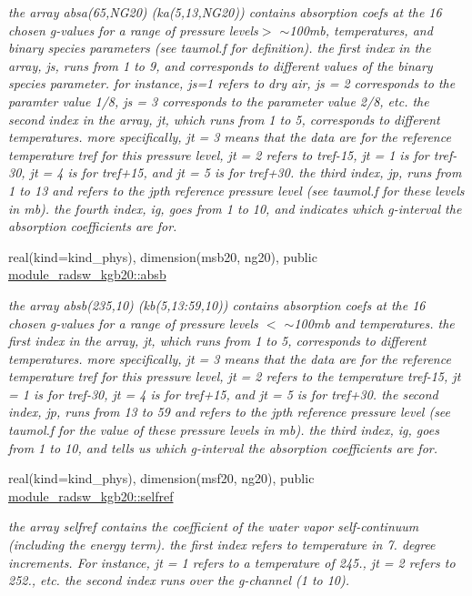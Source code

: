 \begin{Indent}
\begin{DoxyCompactItemize}
\begin{DoxyCompactList}\small\item\em the array absa(65,\+N\+G20) (ka(5,13,\+N\+G20)) contains absorption coefs at the 16 chosen g-\/values for a range of pressure levels$>$ $\sim$100mb, temperatures, and binary species parameters (see taumol.\+f for definition). the first index in the array, js, runs from 1 to 9, and corresponds to different values of the binary species parameter. for instance, js=1 refers to dry air, js = 2 corresponds to the paramter value 1/8, js = 3 corresponds to the parameter value 2/8, etc. the second index in the array, jt, which runs from 1 to 5, corresponds to different temperatures. more specifically, jt = 3 means that the data are for the reference temperature tref for this pressure level, jt = 2 refers to tref-\/15, jt = 1 is for tref-\/30, jt = 4 is for tref+15, and jt = 5 is for tref+30. the third index, jp, runs from 1 to 13 and refers to the jpth reference pressure level (see taumol.\+f for these levels in mb). the fourth index, ig, goes from 1 to 10, and indicates which g-\/interval the absorption coefficients are for. \end{DoxyCompactList}\item 
real(kind=kind\+\_\+phys), dimension(msb20, ng20), public \hyperlink{group__module__radsw__kgbnn_gaf5b135f82f34831e86a12f726cbe47ad}{module\+\_\+radsw\+\_\+kgb20\+::absb}
\begin{DoxyCompactList}\small\item\em the array absb(235,10) (kb(5,13\+:59,10)) contains absorption coefs at the 16 chosen g-\/values for a range of pressure levels $<$ $\sim$100mb and temperatures. the first index in the array, jt, which runs from 1 to 5, corresponds to different temperatures. more specifically, jt = 3 means that the data are for the reference temperature tref for this pressure level, jt = 2 refers to the temperature tref-\/15, jt = 1 is for tref-\/30, jt = 4 is for tref+15, and jt = 5 is for tref+30. the second index, jp, runs from 13 to 59 and refers to the jpth reference pressure level (see taumol.\+f for the value of these pressure levels in mb). the third index, ig, goes from 1 to 10, and tells us which g-\/interval the absorption coefficients are for. \end{DoxyCompactList}\item 
real(kind=kind\+\_\+phys), dimension(msf20, ng20), public \hyperlink{group__module__radsw__kgbnn_gaa3853af5e29277f9ed2bdd397cab5029}{module\+\_\+radsw\+\_\+kgb20\+::selfref}
\begin{DoxyCompactList}\small\item\em the array selfref contains the coefficient of the water vapor self-\/continuum (including the energy term). the first index refers to temperature in 7. degree increments. For instance, jt = 1 refers to a temperature of 245., jt = 2 refers to 252., etc. the second index runs over the g-\/channel (1 to 10). \end{DoxyCompactList}\item 

\end{DoxyCompactItemize}
\end{Indent}
